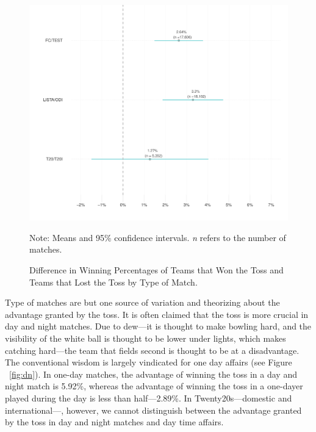 \documentclass[12pt]{article}
\begin{document}
\begin{figure}[htbp]
\caption{Difference in Winning Percentages of Teams that Won the Toss and Teams that Lost the Toss by Type of Match.}
\begin{minipage}{0.85\textwidth}
\centering
\includegraphics[scale=.85]{../figs/winbyType.pdf}
{\footnotesize Note: Means and 95\% confidence intervals. \emph{n} refers to the number of matches.\par}
\end{minipage}
\label{fig:type}
\end{figure}

Type of matches are but one source of variation and theorizing about the advantage granted by the toss. It is often claimed that the toss is more crucial in day and night matches. Due to dew---it is thought to make bowling hard, and the visibility of the white ball is thought to be lower under lights, which makes catching hard---the team that fields second is thought to be at a disadvantage. The conventional wisdom is largely vindicated for one day affairs (see Figure ~\ref{fig:dn}). In one-day matches, the advantage of winning the toss in a day and night match is 5.92\%, whereas the advantage of winning the toss in a one-dayer played during the day is less than half---2.89\%. In Twenty20s---domestic and international---, however, we cannot distinguish between the advantage granted by the toss in day and night matches and day time affairs.
\end{document}

